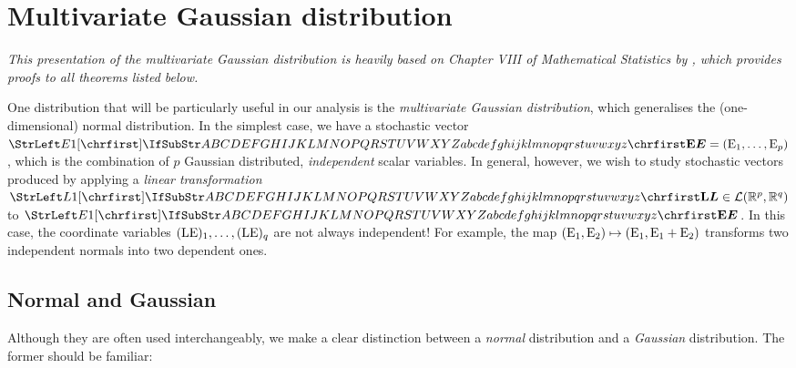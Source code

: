 \documentclass[main.tex]{subfiles}
\begin{document}

\section{Multivariate Gaussian distribution}
\emph{This presentation of the multivariate Gaussian distribution is heavily based on Chapter VIII of \emph{Mathematical Statistics} by \cite{Pestman1998}, which provides proofs to all theorems listed below.}

One distribution that will be particularly useful in our analysis is the \emph{multivariate Gaussian distribution}, which generalises the (one-dimensional) normal distribution. In the simplest case, we have a stochastic vector $\mat{E}=(\mel{E}_1, \dots, \mel{E}_p)$, which is the combination of $p$ Gaussian distributed, \emph{independent} scalar variables. In general, however, we wish to study stochastic vectors produced by applying a \emph{linear transformation} $\mat{L} \in \mathcal{L}(\mathbb{R}^p, \mathbb{R}^q)$ to $\mat{E}$. In this case, the coordinate variables $({\mathrm{LE}})_1,\dots,({\mathrm{LE}})_q$ are not always independent! For example, the map $({\mathrm{E}}_1, {\mathrm{E}}_2) \mapsto ({\mathrm{E}}_1, {\mathrm{E}}_1 + {\mathrm{E}}_2)$ transforms two independent normals into two dependent ones.
\subsection{Normal and Gaussian}
Although they are often used interchangeably, we make a clear distinction between a \emph{normal} distribution and a \emph{Gaussian} distribution. The former should be familiar:
\end{document}
